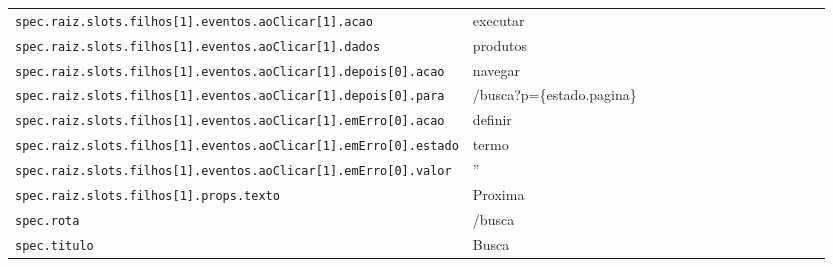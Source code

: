 \begin{tabular}{@{}p{0.35\linewidth}p{0.6\linewidth}@{}}
\texttt{spec.raiz.slots.filhos[1].eventos.aoClicar[1].acao} & executar \\
\texttt{spec.raiz.slots.filhos[1].eventos.aoClicar[1].dados} & produtos \\
\texttt{spec.raiz.slots.filhos[1].eventos.aoClicar[1].depois[0].acao} & navegar \\
\texttt{spec.raiz.slots.filhos[1].eventos.aoClicar[1].depois[0].para} & /busca?p=\{estado.pagina\} \\
\texttt{spec.raiz.slots.filhos[1].eventos.aoClicar[1].emErro[0].acao} & definir \\
\texttt{spec.raiz.slots.filhos[1].eventos.aoClicar[1].emErro[0].estado} & termo \\
\texttt{spec.raiz.slots.filhos[1].eventos.aoClicar[1].emErro[0].valor} & '' \\
\texttt{spec.raiz.slots.filhos[1].props.texto} & Proxima \\
\texttt{spec.rota} & /busca \\
\texttt{spec.titulo} & Busca \\
\end{tabular}
